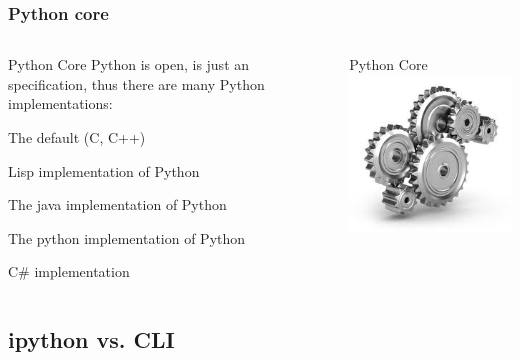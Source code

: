 \documentclass[colorlinks]{beamer}
\begin{document}
\begin{frame}[fragile]\frametitle{Python core}
 
 \begin{columns}[T]
    \begin{column}{.7\textwidth}
        \begin{block}{\centering Python Core}
\small Python is open, is just an specification, thus there are many Python implementations:
\begin{description}
\scriptsize    
    \item[CPython] The default (C, C++)
    \item[CLPython] Lisp implementation of Python
    \item[Jython] The java implementation of Python
    \item[PyPy] The python implementation of Python
    \item [IronPython] C\# implementation
\end{description}
        \end{block}
    \end{column}
    \begin{column}{.3\textwidth}
\begin{center}
Python Core
\includegraphics[scale=0.3]{figs/gears.jpg}
\end{center}    
    \end{column}
  \end{columns}
\end{frame}


\subsection{ipython vs. CLI}
\end{document}
